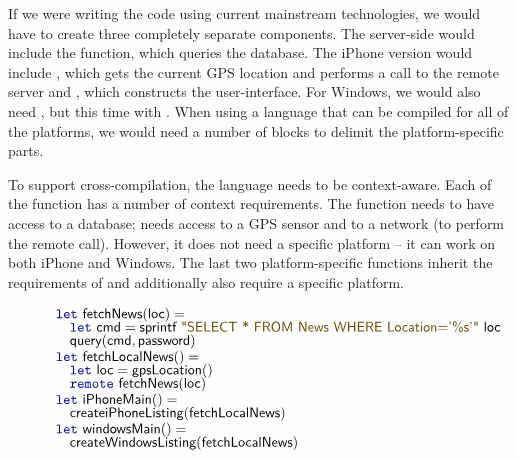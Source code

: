If we were writing the code using current mainstream technologies, we would have to create three
completely separate components. The server-side would include the  function, which
queries the database. The iPhone version would include , which gets the current
GPS location and performs a call to the remote server and , which constructs the
user-interface. For Windows, we would also need , but this time with
. When using a language that can be compiled for all of the platforms, we would need
a number of  blocks to delimit the platform-specific parts.

To support cross-compilation, the language needs to be context-aware. Each of the function has a
number of context requirements. The  function needs to have access to a database;
 needs access to a GPS sensor and to a network (to perform the remote call).
However, it does not need a specific platform -- it can work on both iPhone and Windows. The last
two platform-specific functions inherit the requirements of  and additionally
also require a specific platform.



\begin{figure}
\begin{equation*}
\begin{array}{l}
\kvd{let}~\ident{fetchNews}(\ident{loc}) =\\[-0.25em]
\hspace{1em} \kvd{let}~\ident{cmd} = \ident{sprintf}~\str{SELECT * FROM News WHERE Location='\%s'}~\ident{loc}\\[-0.25em]
\hspace{1em} \ident{query}(\ident{cmd}, \ident{password})\\[-0.25em]
\\[-1.0em]
\kvd{let}~\ident{fetchLocalNews}() =\\[-0.25em]
\hspace{1em} \kvd{let}~\ident{loc} = \ident{gpsLocation}()\\[-0.25em]
\hspace{1em} \kvd{remote}~\ident{fetchNews}(\ident{loc})\\[-0.25em]
\\[-1.0em]
\kvd{let}~\ident{iPhoneMain}() = \\[-0.25em]
\hspace{1em} \ident{createiPhoneListing}(\ident{fetchLocalNews})\\[-0.25em]
\\[-1.0em]
\kvd{let}~\ident{windowsMain}() = \\[-0.25em]
\hspace{1em} \ident{createWindowsListing}(\ident{fetchLocalNews})
\end{array}
\end{equation*}

\label{fig:introduction-sample}
\end{figure}

